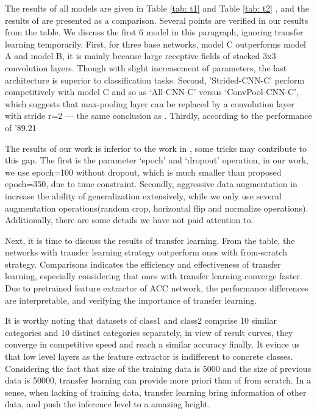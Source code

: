 \documentclass[10pt,twocolumn,letterpaper]{article}
\begin{document}
    The results of all models are given in Table \ref{tab: t1} and Table \ref{tab: t2}  , and the results of \cite{striving} are presented as a comparison. Several points are verified in our results from the table. We discuss the first 6 model in this paragraph, ignoring transfer learning temporarily. First, for three base networks, model C outperforms model A and model B, it is mainly because large receptive fields of stacked 3x3 convolution layers. Though with slight increasement of  parameters, the last architecture is superior to classification tasks. Second, ’Strided-CNN-C’ perform competitively with  model C and so as ‘All-CNN-C’ versus ‘ConvPool-CNN-C’, which suggests that max-pooling layer can be replaced by a convolution layer with stride r=2 — the same conclusion as \cite{striving}. Thirdly, according to the performance of ’89.21%
    
    The results of our work is inferior to the work in \cite{striving}, some tricks may contribute to this gap. The first is the parameter ‘epoch’ and ‘dropout’ operation, in our work, we use epoch=100 without dropout, which is much smaller than proposed epoch=350, due to time constraint. Secondly, aggressive data augmentation in \cite{striving} increase the ability of generalization extensively, while we only use several augmentation operations(random crop, horizontal flip and normalize operations). Additionally, there are some details we have not paid attention to.

    Next, it is time to discuss the results of transfer learning. From the table, the networks with transfer learning strategy outperform ones with from-scratch strategy. Comparisons indicates the efficiency and effectiveness of transfer learning, especially considering that ones with transfer learning converge faster. Due to pretrained feature extractor of ACC network, the performance differences are interpretable, and verifying the importance of transfer learning. 
    
    It is worthy noting that datasets of class1 and class2 comprise 10 similar categories and 10 distinct categories separately, in view of result curves, they converge in competitive speed and reach a similar accuracy finally. It evince us that low level layers as the feature extractor is indifferent to concrete classes. Considering the fact that size of the training data is 5000 and the size of previous data is 50000, transfer learning can provide more priori than of from scratch. In a sense, when lacking of training data, transfer learning bring information of other data, and push the inference level to a amazing height. 
\end{document}
